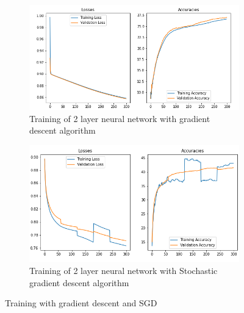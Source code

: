 \documentclass[a4paper, 12pt]{article}
\begin{document}
	\begin{figure}[h]
		\begin{subfigure}{0.45\linewidth}
			\centering
			\includegraphics[scale = 0.35]{../images/two_layer_nn}
			\caption{Training of 2 layer neural network with gradient descent algorithm}
			\label{fig:nn2}
		\end{subfigure}
		\hfill
		\begin{subfigure}{0.45\linewidth}
			\centering
			\includegraphics[scale = 0.35]{../images/two_layer_nn_sgd}
			\caption{Training of 2 layer neural network with Stochastic gradient descent algorithm}
			\label{fig:nn2sgd}
		\end{subfigure}
		\caption{Training with gradient descent and SGD}
	\end{figure}
\end{document}

